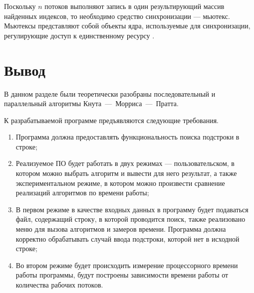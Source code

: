 Поскольку $n$ потоков выполняют запись в один результирующий массив найденных индексов, то необходимо средство синхронизации --- мьютекс. Мьютексы представляют собой объекты ядра, используемые для синхронизации, регулирующие доступ к единственному ресурсу \cite{mutex}.

\section{Вывод}

В данном разделе были теоретически разобраны последовательный и параллельный алгоритмы Кнута~---~Морриса~---~Пратта. 

К разрабатываемой программе предъявляются следующие требования.
\begin{enumerate}
	\item Программа должна предоставлять функциональность поиска подстроки в строке;
	
	\item Реализуемое ПО будет работать в двух режимах --- пользовательском, в котором можно выбрать алгоритм и вывести для него результат, а также экспериментальном режиме, в котором можно произвести сравнение реализаций алгоритмов по времени работы;
	
	\item В первом режиме в качестве входных данных в программу будет подаваться файл, содержащий строку, в которой проводится поиск, также реализовано меню для вызова алгоритмов и замеров времени. Программа должна корректно обрабатывать случай ввода подстроки, которой нет в исходной строке;
	
	\item Во втором режиме будет происходить измерение процессорного времени работы программы, будут построены зависимости времени работы от количества рабочих потоков.
\end{enumerate}